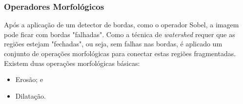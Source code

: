 


   

\subsubsection{Operadores Morfológicos}
Após a aplicação de um detector de bordas, como o operador Sobel, a imagem pode ficar com bordas "falhadas". Como a técnica de \textit{watershed} requer que as regiões estejam "fechadas", ou seja, sem falhas nas bordas, é aplicado um conjunto de operações morfológicas para conectar estas regiões fragmentadas. 
Existem duas operações morfológicas básicas:
\begin{itemize}
    \item Erosão; e
    \item Dilatação.
\end{itemize}    

